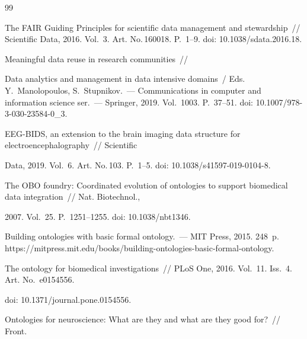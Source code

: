         {\small\frenchspacing

        {%


        \begin{thebibliography}{99}




 The FAIR Guiding Principles for scientific data management and stewardship~/\!\!/ Scientific Data, 2016. Vol.~3. Art. No.\,160018. P.~1--9. doi: 10.1038/sdata.2016.18.


 Meaningful data reuse in research communities~/\!\!/ 

Data analytics and management in data intensive domains~/ Eds. Y.~Manolopoulos,  S.~Stupnikov.~--- Communications in computer and information science ser.~--- Springer, 2019. Vol.~1003. P.~37--51. doi: 10.1007/978-3-030-23584-0\_3.


 EEG-BIDS, an extension to the brain imaging data structure for electroencephalography~/\!\!/ Scientific 

Data, 2019. Vol.~6. Art. No.\,103. P.~1--5. doi: 10.1038/s41597-019-0104-8.


 The OBO foundry: Coordinated evolution of ontologies to support biomedical data integration~/\!\!/ Nat. Biotechnol.,

 2007. Vol.~25. P.~1251--1255. doi: 10.1038/nbt1346.


 Building ontologies with basic formal ontology.~--- MIT Press, 2015. 248~p. {\sf https://mitpress.mit.edu/books/building-ontologies-basic-formal-ontology.}


 The ontology for biomedical investigations~/\!\!/ PLoS One, 2016. Vol.~11. Iss.~4. Art. No.~e0154556.

 doi: 10.1371/journal.pone.0154556.


 Ontologies for neuroscience: What are they and what are they good for?~/\!\!/ Front. 


\end{thebibliography}}}

